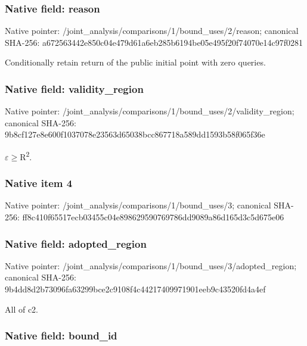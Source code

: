\documentclass[10pt,a4paper]{article}
\begin{document}
\subsubsection{Native field: reason}


Native pointer: /joint\_analysis/comparis\allowbreak{}ons/1/bound\_uses/2/reaso\allowbreak{}n; canonical SHA-256: a672563442e850c04e479d61\allowbreak{}a6eb285b6194be05e495f20f\allowbreak{}74070e14c97f0281


Conditionally retain return of the public initial point with zero queries.


\subsubsection{Native field: validity\_region}


Native pointer: /joint\_analysis/comparis\allowbreak{}ons/1/bound\_uses/2/valid\allowbreak{}ity\_region; canonical SHA-256: 9b8cf127e8e600f1037078e2\allowbreak{}3563d65038bcc867718a589d\allowbreak{}d1593b58f065f36e


\ensuremath{\varepsilon}\ensuremath{\ge}R\textsuperscript{2}.


\subsubsection{Native item 4}


Native pointer: /joint\_analysis/comparis\allowbreak{}ons/1/bound\_uses/3; canonical SHA-256: ff8c410f65517ecb03455c04\allowbreak{}e898629590769786dd9089a8\allowbreak{}6d165d3c5d675e06



\subsubsection{Native field: adopted\_region}


Native pointer: /joint\_analysis/comparis\allowbreak{}ons/1/bound\_uses/3/adopt\allowbreak{}ed\_region; canonical SHA-256: 9b4dd8d2b73096fa63299bce\allowbreak{}2c9108f4c44217409971901e\allowbreak{}eb9c43520fd4a4ef


All of c2.


\subsubsection{Native field: bound\_id}
\end{document}

